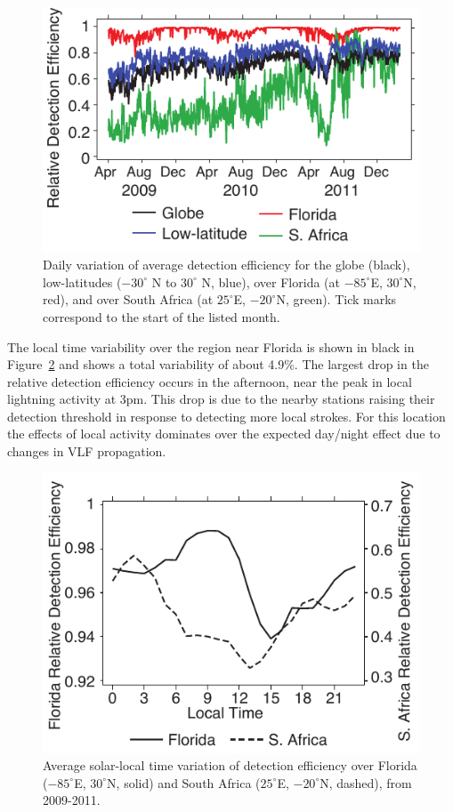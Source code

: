 \begin{figure}[ht!]
   \centering
\noindent\includegraphics[scale=1]{efficiency/Figures/2012RS005049-p10.pdf}
   \caption{Daily variation of average detection efficiency for the globe (black), low-latitudes ($-30^\circ$ N to $30^\circ$ N, blue), over Florida (at $-85^\circ$E, $30^\circ$N, red), and over South Africa (at $25^\circ$E, $-20^\circ$N, green).
   Tick marks correspond to the start of the listed month.}
   \label{efficiency:fig:deTrendLocal}
\end{figure}

The local time variability over the region near Florida is shown in black in Figure~\ref{efficiency:fig:deUTC} and shows a total variability of about 4.9\%.
The largest drop in the relative detection efficiency occurs in the afternoon, near the peak in local lightning activity at 3pm.
This drop is due to the nearby stations raising their detection threshold in response to detecting more local strokes.
For this location the effects of local activity dominates over the expected day/night effect due to changes in VLF propagation.

\begin{figure}[ht!]
   \centering
\noindent\includegraphics[scale=1]{efficiency/Figures/2012RS005049-f11.pdf}
   \caption{Average solar-local time variation of detection efficiency over Florida ($-85^\circ$E, $30^\circ$N, solid) and South Africa ($25^\circ$E, $-20^\circ$N, dashed), from 2009-2011.}
   \label{efficiency:fig:deUTC}
\end{figure}

